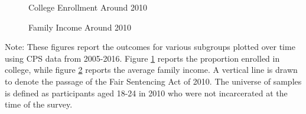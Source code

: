 \clearpage  
  
\begin{figure}[h]
  \centering
  \caption{College Enrollment Around 2010}%
  \qquad
  \label{fig:raw_college_2010}%
\end{figure}

\begin{figure}[h]
  \centering
  \caption{Family Income Around 2010}%
  \qquad
  \label{fig:raw_faminc_2010}%
\end{figure}

\begin{footnotesize}
  \noindent Note: These figures report the outcomes for various subgroups plotted over time using CPS data from 2005-2016. Figure \ref{fig:raw_college_2010} reports the proportion enrolled in college, while figure \ref{fig:raw_faminc_2010} reports the average family income. A vertical line is drawn to denote the passage of the Fair Sentencing Act of 2010. The universe of samples is defined as participants aged 18-24 in 2010 who were not incarcerated at the time of the survey.
\end{footnotesize}

\clearpage
